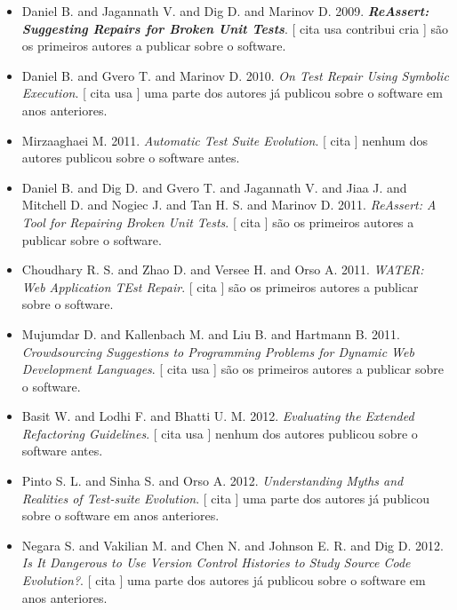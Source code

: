 \begin{itemize}
\item Daniel B. and Jagannath V. and Dig D. and Marinov D.
      2009.
        \textbf{\textit{ ReAssert: Suggesting Repairs for Broken Unit Tests}}.
      [
          cita
          usa
          contribui
          cria
      ]
são os primeiros autores a publicar sobre o software.
\item Daniel B. and Gvero T. and Marinov D.
      2010.
        \textit{ On Test Repair Using Symbolic Execution}.
      [
          cita
          usa
      ]
uma parte dos autores já publicou sobre o software em anos anteriores.
\item Mirzaaghaei M.
      2011.
        \textit{ Automatic Test Suite Evolution}.
      [
          cita
      ]
nenhum dos autores publicou sobre o software antes.
\item Daniel B. and Dig D. and Gvero T. and Jagannath V. and Jiaa J. and Mitchell D. and Nogiec J. and Tan H. S. and Marinov D.
      2011.
        \textit{ ReAssert: A Tool for Repairing Broken Unit Tests}.
      [
          cita
      ]
são os primeiros autores a publicar sobre o software.
\item Choudhary R. S. and Zhao D. and Versee H. and Orso A.
      2011.
        \textit{ WATER: Web Application TEst Repair}.
      [
          cita
      ]
são os primeiros autores a publicar sobre o software.
\item Mujumdar D. and Kallenbach M. and Liu B. and Hartmann B.
      2011.
        \textit{ Crowdsourcing Suggestions to Programming Problems for Dynamic Web Development Languages}.
      [
          cita
          usa
      ]
são os primeiros autores a publicar sobre o software.
\item Basit W. and Lodhi F. and Bhatti U. M.
      2012.
        \textit{ Evaluating the Extended Refactoring Guidelines}.
      [
          cita
          usa
      ]
nenhum dos autores publicou sobre o software antes.
\item Pinto S. L. and Sinha S. and Orso A.
      2012.
        \textit{ Understanding Myths and Realities of Test-suite Evolution}.
      [
          cita
      ]
uma parte dos autores já publicou sobre o software em anos anteriores.
\item Negara S. and Vakilian M. and Chen N. and Johnson E. R. and Dig D.
      2012.
        \textit{ Is It Dangerous to Use Version Control Histories to Study Source Code Evolution?}.
      [
          cita
      ]
uma parte dos autores já publicou sobre o software em anos anteriores.

\end{itemize}
